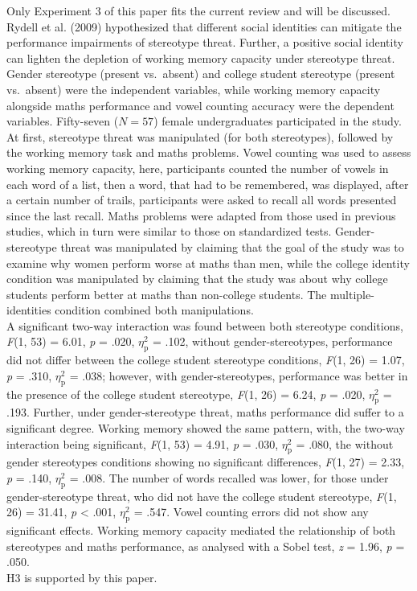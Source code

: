 \documentclass[
  stu,floatsintext]{apa7}
\begin{document}
Only Experiment 3 of this paper fits the current review and will be discussed.
Rydell et al. (2009) hypothesized that different social identities can mitigate the performance impairments of stereotype threat.
Further, a positive social identity can lighten the depletion of working memory capacity under stereotype threat.\\
Gender stereotype (present vs.~absent) and college student stereotype (present vs.~absent) were the independent variables, while working memory capacity alongside maths performance and vowel counting accuracy were the dependent variables.
Fifty-seven (\(N = 57\)) female undergraduates participated in the study.
At first, stereotype threat was manipulated (for both stereotypes), followed by the working memory task and maths problems.
Vowel counting was used to assess working memory capacity, here, participants counted the number of vowels in each word of a list, then a word, that had to be remembered, was displayed, after a certain number of trails, participants were asked to recall all words presented since the last recall.
Maths problems were adapted from those used in previous studies, which in turn were similar to those on standardized tests.
Gender-stereotype threat was manipulated by claiming that the goal of the study was to examine why women perform worse at maths than men, while the college identity condition was manipulated by claiming that the study was about why college students perform better at maths than non-college students.
The multiple-identities condition combined both manipulations.\\
A significant two-way interaction was found between both stereotype conditions, \emph{F}(1, 53) = 6.01, \emph{p} = .020, \(\eta^{2}_{\text{p}}\) = .102, without gender-stereotypes, performance did not differ between the college student stereotype conditions, \emph{F}(1, 26) = 1.07, \emph{p} = .310, \(\eta^{2}_{\text{p}}\) = .038; however, with gender-stereotypes, performance was better in the presence of the college student stereotype, \emph{F}(1, 26) = 6.24, \emph{p} = .020, \(\eta^{2}_{\text{p}}\) = .193.
Further, under gender-stereotype threat, maths performance did suffer to a significant degree.
Working memory showed the same pattern, with, the two-way interaction being significant, \emph{F}(1, 53) = 4.91, \emph{p} = .030, \(\eta^{2}_{\text{p}}\) = .080, the without gender stereotypes conditions showing no significant differences, \emph{F}(1, 27) = 2.33, \emph{p} = .140, \(\eta^{2}_{\text{p}}\) = .008.
The number of words recalled was lower, for those under gender-stereotype threat, who did not have the college student stereotype, \emph{F}(1, 26) = 31.41, \emph{p} \textless{} .001, \(\eta^{2}_{\text{p}}\) = .547.
Vowel counting errors did not show any significant effects.
Working memory capacity mediated the relationship of both stereotypes and maths performance, as analysed with a Sobel test, \emph{z} = 1.96, \emph{p} = .050.\\
H3 is supported by this paper.
\end{document}
